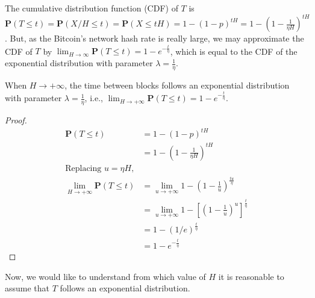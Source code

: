 The cumulative distribution function (CDF) of $T$ is $\mathbf{P}(T \leq t) = \mathbf{P}(X/H \leq t) = \mathbf{P}(X \leq tH) = 1 - (1-p)^{tH} = 1 - \left( 1-\frac{1}{\eta H} \right)^{tH}$. But, as the Bitcoin's network hash rate is really large, we may approximate the CDF of $T$ by $\lim_{H \rightarrow \infty} \mathbf{P}(T \leq t) = 1 - e^{-\frac{t}{\eta}}$, which is equal to the CDF of the exponential distribution with parameter $\lambda = \frac{1}{\eta}$.

\begin{theorem}
	When $H \rightarrow +\infty$, the time between blocks follows an exponential distribution with parameter $\lambda = \frac{1}{\eta}$, i.e., $\lim_{H \rightarrow +\infty} \mathbf{P}(T \leq t) = 1 - e^{-\frac{t}{\eta}}$.
\end{theorem}
\begin{proof}
\begin{align*}
	\mathbf{P}(T \leq t) &= 1 - (1-p)^{tH} \\
		     &= 1 - \left( 1 - \frac{1}{\eta H} \right)^{tH} \\
	\text{Replacing $u = \eta H$,} \\
	\lim_{H \rightarrow +\infty} \mathbf{P}(T \leq t) &= \lim_{u \rightarrow +\infty} 1 - \left( 1 - \frac{1}{u} \right)^{\frac{tu}{\eta}} \\
				&= \lim_{u \rightarrow +\infty} 1 - \left[ \left( 1 - \frac{1}{u} \right)^{u} \right]^{\frac{t}{\eta}} \\
				&= 1 - \left( 1/e \right)^{\frac{t}{\eta}} \\
				&= 1 - e^{-\frac{t}{\eta}}
\end{align*}
\end{proof}

Now, we would like to understand from which value of $H$ it is reasonable to assume that $T$ follows an exponential distribution.

